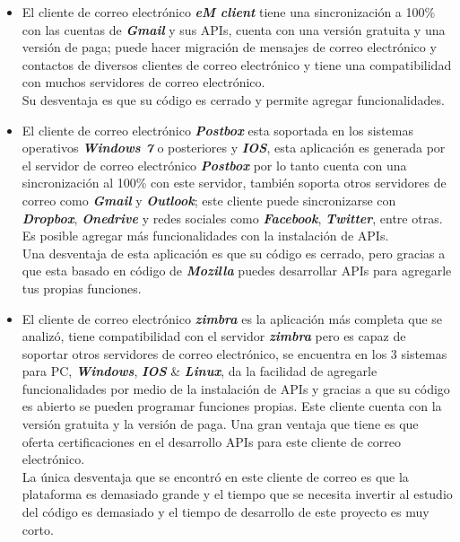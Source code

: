 \begin{itemize}
 \item El cliente de correo electrónico \textbf{\textit{eM client}} tiene una sincronización a 100\% con las cuentas de \textbf{\textit{Gmail}} y sus APIs, cuenta con una versión gratuita y una versión de paga; puede hacer migración de mensajes de correo electrónico y contactos de diversos clientes de correo electrónico y tiene una compatibilidad con muchos servidores de correo electrónico.\cite{em}\\Su desventaja es que su código es cerrado y permite agregar funcionalidades.
 \item El cliente de correo electrónico \textbf{\textit{Postbox}} esta soportada en los sistemas operativos \textbf{\textit{Windows 7}} o posteriores y \textbf{\textit{IOS}}, esta aplicación es generada por el servidor de correo electrónico \textbf{\textit{Postbox}} por lo tanto cuenta con una sincronización al 100\% con este servidor, también soporta otros servidores de correo como \textbf{\textit{Gmail}} y \textbf{\textit{Outlook}}; este cliente puede sincronizarse con \textbf{\textit{Dropbox}}, \textbf{\textit{Onedrive}} y redes sociales como \textbf{\textit{Facebook}}, \textbf{\textit{Twitter}}, entre otras. Es posible agregar más funcionalidades con la instalación de APIs.\\Una desventaja de esta aplicación es que su código es cerrado, pero gracias a que esta basado en código de \textbf{\textit{Mozilla}} puedes desarrollar APIs para agregarle tus propias funciones. \cite{box}
 \item El cliente de correo electrónico \textbf{\textit{zimbra}} es la aplicación más completa que se analizó, tiene compatibilidad con el servidor \textbf{\textit{zimbra}} pero es capaz de soportar otros servidores de correo electrónico, se encuentra en los 3 sistemas para PC, \textbf{\textit{Windows}}, \textbf{\textit{IOS}} \& \textbf{\textit{Linux}}, da la facilidad de agregarle funcionalidades por medio de la instalación de APIs y gracias a que su código es abierto se pueden programar funciones propias. Este cliente cuenta con la versión gratuita y la versión de paga. Una gran ventaja que tiene es que oferta certificaciones en el desarrollo APIs para este cliente de correo electrónico.\cite{zim}\\La única desventaja que se encontró en este cliente de correo es que la plataforma es demasiado grande y el tiempo que se necesita invertir al estudio del código es demasiado y el tiempo de desarrollo de este proyecto es muy corto.

\end{itemize}
